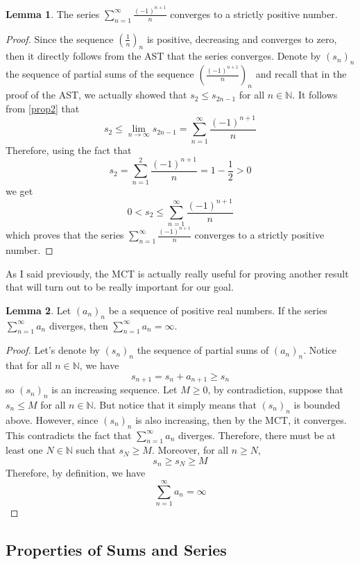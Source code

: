 \documentclass[12pt]{article}
\newcommand{\N}{\mathbb{N}}
\theoremstyle{definition}
\newtheorem{lemma}{Lemma}
\newcounter{prop}[section]
\begin{document}
\begin{lemma} \label{lemma1}
    The series $\sum_{n=1}^{\infty}\frac{(-1)^{n+1}}{n}$ converges to a strictly positive number.
\end{lemma}

\begin{proof}
    Since the sequence $(\frac{1}{n})_n$ is positive, decreasing and converges to zero, then it directly follows from the AST that the series converges. Denote by $(s_n)_n$ the sequence of partial sums of the sequence $(\frac{(-1)^{n+1}}{n})_n$ and recall that in the proof of the AST, we actually showed that $s_2 \leq s_{2n-1}$ for all $n \in \N$. It follows from \ref{prop2} that
    $$s_2 \leq \lim_{n \rightarrow \infty}s_{2n-1} = \sum_{n=1}^{\infty}\frac{(-1)^{n+1}}{n}$$
    Therefore, using the fact that
    $$s_2 = \sum_{n=1}^{2}\frac{(-1)^{n+1}}{n} = 1 - \frac{1}{2} > 0$$
    we get
    $$0 < s_2 \leq \sum_{n=1}^{\infty}\frac{(-1)^{n+1}}{n}$$
    which proves that the series $\sum_{n=1}^{\infty}\frac{(-1)^{n+1}}{n}$ converges to a strictly positive number.
\end{proof}

As I said previously, the MCT is actually really useful for proving another result that will turn out to be really important for our goal.

\begin{lemma} \label{lemma2}
    Let $(a_n)_n$ be a sequence of positive real numbers. If the series $\sum_{n=1}^{\infty}a_n$ diverges, then $\sum_{n=1}^{\infty}a_n = \infty$.
\end{lemma}

\begin{proof}
    Let's denote by $(s_n)_n$ the sequence of partial sums of $(a_n)_n$. Notice that for all $n \in \N$, we have
    $$s_{n+1} = s_n + a_{n+1} \geq s_n$$
    so $(s_n)_n$ is an increasing sequence. Let $M \geq 0$, by contradiction, suppose that $s_n \leq M$ for all $n \in \N$. But notice that it simply means that $(s_n)_n$ is bounded above. However, since $(s_n)_n$ is also increasing, then by the MCT, it converges. This contradicts the fact that $\sum_{n=1}^{\infty}a_n$ diverges. Therefore, there must be at least one $N \in \N$ such that $s_N \geq M$. Moreover, for all $n \geq N$,
    $$s_n \geq s_N \geq M$$
    Therefore, by definition, we have
    $$\sum_{n=1}^{\infty}a_n = \infty$$
\end{proof}

\subsection{Properties of Sums and Series}
\end{document}
